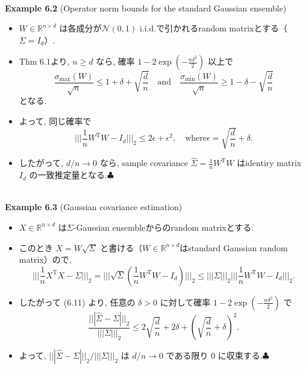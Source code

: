 \documentclass[unicode,aspectratio=169,11pt]{beamer}
\def\endexample{\hfill $\clubsuit$}
\newcommand{\bb}{\mathbb}
\newcommand{\cc}{\mathcal}
\newcommand{\tr}{\mathrm{T}}
\begin{document}
\begin{frame}{}{}
　\\
{\bf Example 6.2} (Operator norm bounds for the standard Gaussian ensemble)
\begin{itemize}
  \item $W \in \bb{R}^{n \times d}$ は各成分が$\cc{N} (0,1)$ i.i.d.で引かれるrandom matrixとする（$\Sigma = I_d$）.
  \item Thm 6.1より, $n \ge d$ なら, 確率 $1 - 2 \exp\left(-\frac{n\delta^2}{2}\right)$ 以上で
  \[\frac{\sigma_{\max}(W)}{\sqrt{n}} \le 1 + \delta + \sqrt{\frac{d}{n}}
  \quad \mathrm{and} \quad
  \frac{\sigma_{\min}(W)}{\sqrt{n}} \ge 1 - \delta - \sqrt{\frac{d}{n}}
  \tag{6.10}
  \]
  となる.
  \item よって, 同じ確率で
  \[ \Bigg|\Bigg|\Bigg| \frac{1}{n}W^\tr W - I_d \Bigg|\Bigg|\Bigg|_2 \le 2\epsilon + \epsilon^2,
  \quad \mathrm{where} \epsilon = \sqrt{\frac{d}{n}} + \delta.
  \tag{6.11} \]
  \item したがって, $d/n \to 0$ なら, sample covariance $\widehat{\Sigma} = \frac{1}{n}W^\tr W$ はidentiry matrix $I_d$ の一致推定量となる.\endexample
\end{itemize}
\end{frame}

\begin{frame}{}{}
　\\
{\bf Example 6.3} (Gaussian covariance estimation)
\begin{itemize}
  \item $X \in \bb{R}^{n \times d}$ は$\Sigma$-Gaussian ensembleからのrandom matrixとする.
  \item このとき $X = W \sqrt{\Sigma}$ と書ける（$W \in \bb{R}^{n\times d}$はstandard Gaussian random matrix）ので,
          \[
              \Bigg|\Bigg|\Bigg| \frac{1}{n} X^\tr X - \Sigma \Bigg|\Bigg|\Bigg|_2
              = \Bigg|\Bigg|\Bigg|\sqrt{\Sigma}\left(\frac{1}{n}W^\tr W - I_d\right) \Bigg|\Bigg|\Bigg|_2
              \le |||\Sigma|||_2 \Bigg|\Bigg|\Bigg| \frac{1}{n} W^\tr W - I_d \Bigg|\Bigg|\Bigg|_2.
          \]
  \item したがって (6.11) より, 任意の $\delta > 0$ に対して確率 $1 - 2\exp\left(-\frac{n \delta^2}{2}\right)$ で
          \[
            \frac{||| \widehat{\Sigma} - \Sigma |||_2}{|||\Sigma|||_2}
            \le 2 \sqrt{\frac{d}{n}} + 2\delta + \left(\sqrt{\frac{d}{n}} + \delta\right)^2.
            \tag{6.12} 
          \]
  \item よって, $||| \widehat{\Sigma} - \Sigma |||_2 / |||\Sigma|||_2$ は $d/n \to 0$ である限り $0$ に収束する.\endexample
\end{itemize}
\end{frame}
\end{document}
